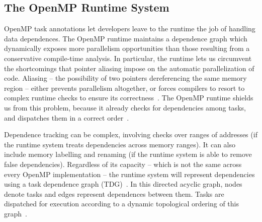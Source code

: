 \documentclass[sigplan,10pt,screen]{acmart}
\begin{document}
\subsection{The OpenMP Runtime System}
\label{sub:adv}

OpenMP task annotations let developers leave to the runtime the job of handling data
dependences.
The OpenMP runtime maintains a dependence graph which dynamically exposes more parallelism 
opportunities than those resulting from a conservative  compile-time  analysis.
In particular, the runtime lets us circumvent the shortcomings that pointer aliasing
impose on the automatic parallelization of code.
Aliasing -- the possibility of two pointers dereferencing the same
memory region -- either prevents parallelism altogether, or forces compilers to
resort to complex runtime checks to ensure its
correctness~\cite{Alves15,Ravishankar14}.
The OpenMP runtime shields us from this problem, because
it already checks for dependencies among tasks, and dispatches them in a
correct order~\cite{LaGrone11}.

Dependence tracking can be complex, involving checks over ranges of addresses
(if the runtime system treats dependencies across memory ranges).
It can also include memory labelling and renaming (if the
runtime system is able to remove false dependencies).
Regardless of its capacity -- which is not the same across every OpenMP
implementation -- the runtime system will represent dependencies using a task
dependence graph (TDG)~\cite{Duran08}.
In this directed acyclic graph, nodes denote tasks and edges represent
dependences between them.
Tasks are dispatched for execution according to a dynamic topological ordering of
this graph~\cite{Planas15}.
\end{document}
